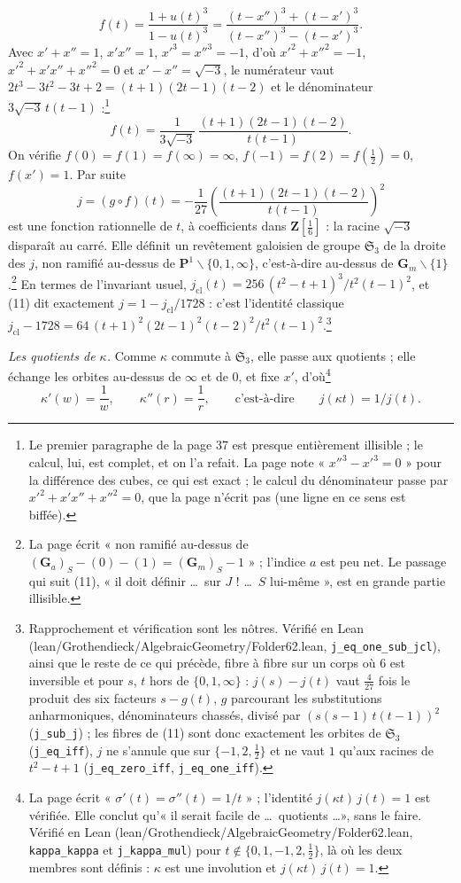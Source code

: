\documentclass[11pt,a4paper]{article}
\begin{document}
\[
f(t) = \frac{1 + u(t)^3}{1 - u(t)^3}
= \frac{(t - x'')^3 + (t - x')^3}{(t - x'')^3 - (t - x')^3}.
\]
Avec $x' + x'' = 1$, $x'x'' = 1$, $x'^3 = x''^3 = -1$, d'où $x'^2 + x''^2 = -1$,
$x'^2 + x'x'' + x''^2 = 0$ et $x' - x'' = \sqrt{-3}$, le numérateur vaut $2t^3
- 3t^2 - 3t + 2 = (t+1)(2t-1)(t-2)$ et le dénominateur $3\sqrt{-3}\,t(t-1)$ :\footnote{Le premier paragraphe de la page 37 est presque entièrement
illisible ; le calcul, lui, est complet, et on l'a refait. La page note
« $x''^3 - x'^3 = 0$ » pour la différence des cubes, ce qui est exact ; le
calcul du dénominateur passe par $x'^2 + x'x'' + x''^2 = 0$, que la page
n'écrit pas (une ligne en ce sens est biffée).}
\[
f(t) = \frac{1}{3\sqrt{-3}}\,\frac{(t+1)(2t-1)(t-2)}{t(t-1)} . \tag{10}
\]
On vérifie $f(0) = f(1) =
f(\infty) = \infty$, $f(-1) = f(2) = f(\frac12) = 0$, $f(x') = 1$.
Par suite
\[
\boxed{\;j = (g \circ f)(t) = -\frac{1}{27}\left(\frac{(t+1)(2t-1)(t-2)}{t(t-1)}\right)^2\;} \tag{11}
\]
est une fonction rationnelle de $t$, à coefficients dans $\mathbf{Z}[\frac16]$ :
la racine $\sqrt{-3}$ disparaît au carré. Elle définit un revêtement galoisien
de groupe $\mathfrak{S}_3$ de la droite des $j$, non ramifié au-dessus de
$\mathbf{P}^1 \smallsetminus \{0, 1, \infty\}$, c'est-à-dire au-dessus de
$\mathbf{G}_m \smallsetminus \{1\}$.\footnote{La page écrit « non ramifié
au-dessus de $(\mathbf{G}_a)_S - (0) - (1) = (\mathbf{G}_m)_S - 1$ » ; l'indice
$a$ est peu net. Le passage qui suit (11), « il doit définir \ldots\ sur $J$ !
\ldots\ $S$ lui-même », est en grande partie illisible.} En termes de
l'invariant usuel, $j_{\mathrm{cl}}(t) = 256\,(t^2 - t + 1)^3/t^2(t-1)^2$, et (11) dit
exactement $j = 1 - j_{\mathrm{cl}}/1728$ : c'est l'identité classique
$j_{\mathrm{cl}} - 1728 = 64\,(t+1)^2(2t-1)^2(t-2)^2/t^2(t-1)^2$.\footnote{Rapprochement
et vérification sont les nôtres. Vérifié en Lean
(lean/Grothendieck/AlgebraicGeometry/Folder62.lean, \texttt{j\_eq\_one\_sub\_jcl}), ainsi
que le reste de ce qui précède, fibre à fibre sur un corps où $6$ est
inversible et pour $s$, $t$ hors de $\{0, 1, \infty\}$ : $j(s) - j(t)$ vaut
$\frac{4}{27}$ fois le produit des six facteurs $s - g(t)$, $g$ parcourant
les substitutions anharmoniques, dénominateurs chassés, divisé par
$(s(s-1)\,t(t-1))^2$ (\texttt{j\_sub\_j}) ; les fibres de (11) sont donc
exactement les orbites de $\mathfrak{S}_3$ (\texttt{j\_eq\_iff}), $j$ ne
s'annule que sur $\{-1, 2, \frac12\}$ et ne vaut $1$ qu'aux racines de
$t^2 - t + 1$ (\texttt{j\_eq\_zero\_iff}, \texttt{j\_eq\_one\_iff}).}

\emph{Les quotients de $\kappa$.} Comme $\kappa$ commute à $\mathfrak{S}_3$,
elle passe aux quotients ; elle échange les orbites au-dessus de $\infty$ et
de $0$, et fixe $x'$, d'où\footnote{La page écrit « $\sigma'(t) = \sigma''(t) = 1/t$ » ; l'identité
$j(\kappa t)\, j(t) = 1$ est vérifiée. Elle conclut qu'« il serait facile de
\ldots\ quotients \ldots », sans le faire. Vérifié en Lean
(lean/Grothendieck/AlgebraicGeometry/Folder62.lean, \texttt{kappa\_kappa} et
\texttt{j\_kappa\_mul}) pour $t \notin \{0, 1, -1, 2, \frac12\}$, là où
les deux membres sont définis : $\kappa$ est une involution et
$j(\kappa t)\,j(t) = 1$.}
\[
\kappa'(w) = \frac1w, \qquad \kappa''(r) = \frac1r, \qquad\text{c'est-à-dire}\qquad
j(\kappa t) = 1/j(t). \tag{12}
\]
\end{document}
